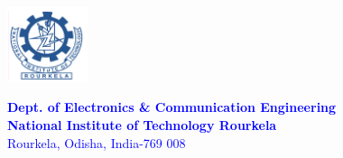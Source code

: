 \begin{titlepage}

\noindent{\LARGE \textbf{{\textcolor{blue}{On Design and Implementation of Generic \\\tiny~\\ \LARGE Fuzzy Logic Controllers}}}}
\par
\vspace{3.2in}
\noindent{\LARGE \textcolor{blue}{Pallab Maji}}
\vspace{3.2in}
\\

\begin{minipage}{.1\linewidth}
	\hspace*{-.6cm}\includegraphics[height=2.2cm]{cover/logo_blue}
\end{minipage}
\hspace{.2cm}
\begin{minipage}{.9\linewidth}
	\textcolor{blue}{
	{\large
		{\textbf{Dept. of Electronics \& Communication Engineering}\\
			\textbf{National Institute of Technology Rourkela\\}}}
	{\large
		{Rourkela, Odisha, India-769 008}}}
	
\end{minipage}

\end{titlepage}
